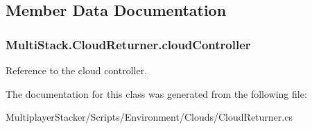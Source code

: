 \subsection{Member Data Documentation}
\hypertarget{class_multi_stack_1_1_cloud_returner_a2a2c664211730eb172f05007161a37e1}{}
\subsubsection[{cloud\+Controller}]{ Multi\+Stack.\+Cloud\+Returner.\+cloud\+Controller}\label{class_multi_stack_1_1_cloud_returner_a2a2c664211730eb172f05007161a37e1}


Reference to the cloud controller. 



The documentation for this class was generated from the following file\+:\begin{DoxyCompactItemize}
\item 
Multiplayer\+Stacker/\+Scripts/\+Environment/\+Clouds/Cloud\+Returner.\+cs\end{DoxyCompactItemize}
